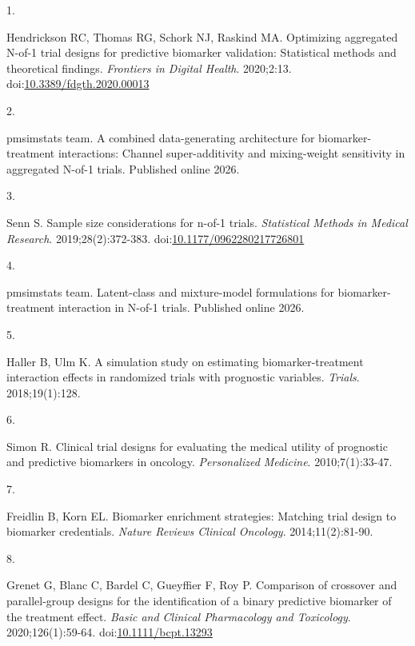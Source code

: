 \documentclass[
  11pt,
]{article}
\newlength{\cslhangindent}
\newlength{\csllabelwidth}
\newenvironment{CSLReferences}[2] %
 {\begin{list}{}{%
  \setlength{\itemindent}{0pt}
  \setlength{\leftmargin}{0pt}
  \setlength{\parsep}{0pt}
  \ifodd #1
   \setlength{\leftmargin}{\cslhangindent}
   \setlength{\itemindent}{-1\cslhangindent}
  \fi
  \setlength{\itemsep}{#2\baselineskip}}}
 {\end{list}}
\newcommand{\CSLLeftMargin}[1]{\parbox[t]{\csllabelwidth}{\strut#1\strut}}
\newcommand{\CSLRightInline}[1]{\parbox[t]{\linewidth - \csllabelwidth}{\strut#1\strut}}
\begin{document}
\protect{}\label{refs}
\begin{CSLReferences}{0}{1}
\CSLLeftMargin{1. }%
\CSLRightInline{Hendrickson RC, Thomas RG, Schork NJ, Raskind MA. Optimizing aggregated {N}-of-1 trial designs for predictive biomarker validation: Statistical methods and theoretical findings. \emph{Frontiers in Digital Health}. 2020;2:13. doi:\href{https://doi.org/10.3389/fdgth.2020.00013}{10.3389/fdgth.2020.00013}}

\CSLLeftMargin{2. }%
\CSLRightInline{{pmsimstats team}. A combined data-generating architecture for biomarker-treatment interactions: Channel super-additivity and mixing-weight sensitivity in aggregated {N}-of-1 trials. Published online 2026.}

\CSLLeftMargin{3. }%
\CSLRightInline{Senn S. Sample size considerations for n-of-1 trials. \emph{Statistical Methods in Medical Research}. 2019;28(2):372-383. doi:\href{https://doi.org/10.1177/0962280217726801}{10.1177/0962280217726801}}

\CSLLeftMargin{4. }%
\CSLRightInline{{pmsimstats team}. Latent-class and mixture-model formulations for biomarker-treatment interaction in {N}-of-1 trials. Published online 2026.}

\CSLLeftMargin{5. }%
\CSLRightInline{Haller B, Ulm K. A simulation study on estimating biomarker-treatment interaction effects in randomized trials with prognostic variables. \emph{Trials}. 2018;19(1):128.}

\CSLLeftMargin{6. }%
\CSLRightInline{Simon R. Clinical trial designs for evaluating the medical utility of prognostic and predictive biomarkers in oncology. \emph{Personalized Medicine}. 2010;7(1):33-47.}

\CSLLeftMargin{7. }%
\CSLRightInline{Freidlin B, Korn EL. Biomarker enrichment strategies: Matching trial design to biomarker credentials. \emph{Nature Reviews Clinical Oncology}. 2014;11(2):81-90.}

\CSLLeftMargin{8. }%
\CSLRightInline{Grenet G, Blanc C, Bardel C, Gueyffier F, Roy P. Comparison of crossover and parallel-group designs for the identification of a binary predictive biomarker of the treatment effect. \emph{Basic and Clinical Pharmacology and Toxicology}. 2020;126(1):59-64. doi:\href{https://doi.org/10.1111/bcpt.13293}{10.1111/bcpt.13293}}


\end{CSLReferences}
\end{document}
